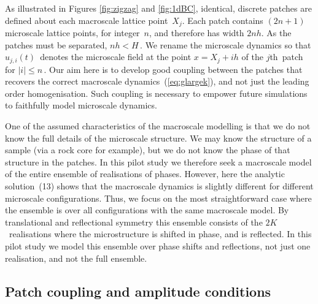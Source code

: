 \documentclass[12pt,a4paper]{article}
\begin{document}
As illustrated in Figures \ref{fig:zigzag} and \ref{fig:1dBC}, identical, discrete patches are defined about each macroscale lattice point~$X_j$. Each patch contains $(2n + 1)$ microscale lattice points, for integer~$n$, and therefore has width $2nh$. As the patches must be separated, $nh < H$\,.  We rename the microscale dynamics so that $u_{j,i}(t)$~denotes the microscale field at the point $x=X_j+ih$ of the $j$th~patch for $|i|\leq n$\,.  Our aim here is to develop good coupling between the patches that recovers the correct macroscale dynamics~(\ref{eq:glargek}), and not just the leading order homogenisation.  Such coupling is necessary to empower future simulations to faithfully model microscale dynamics.

One of the assumed characteristics of the macroscale modelling is that we do not know the full details of the microscale structure.  We may know the structure of a sample (via a rock core for example), but we do not know the phase of that structure in the patches.  In this pilot study we therefore seek a macroscale model of the entire ensemble of realisations of phases.  However, here the analytic solution~(13) shows that the macroscale dynamics is slightly different for different microscale configurations.  Thus, we focus on the most straightforward case where the ensemble is over all configurations with the same macroscale model.  By translational and reflectional symmetry this ensemble consists of the $2K$~realisations where the microstructure is shifted in phase, and is reflected.   In this pilot study we model this ensemble over phase shifts and reflections, not just one realisation, and not the full ensemble.


\subsection{Patch coupling and amplitude conditions}
\label{sec:BC}
\end{document}
